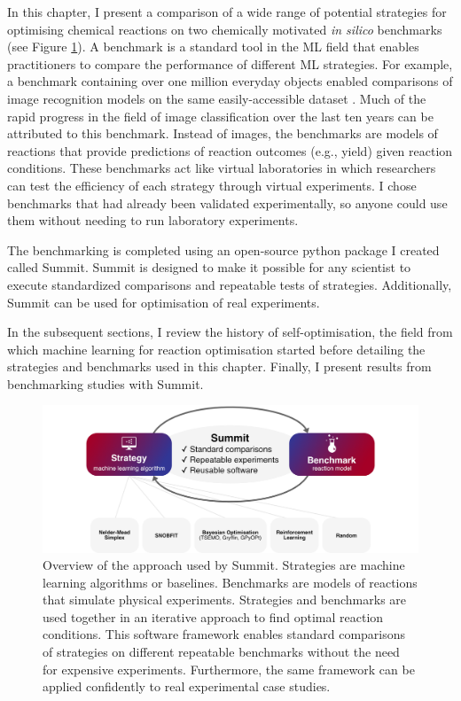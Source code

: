 In this chapter, I present a comparison of a wide range of potential strategies for optimising chemical reactions on two chemically motivated \emph{in silico} benchmarks (see Figure \ref{fig:overview}). A benchmark is a standard tool in the ML field that enables practitioners to compare the performance of different ML strategies. For example, a benchmark containing over one million everyday objects enabled comparisons of image recognition models on the same easily-accessible dataset \cite{Russakovsky2015}. Much of the rapid progress in the field of image classification over the last ten years can be attributed to this benchmark. Instead of images, the benchmarks are models of reactions that provide predictions of reaction outcomes (e.g., yield) given reaction conditions. These benchmarks act like virtual laboratories in which researchers can test the efficiency of each strategy through virtual experiments. I chose benchmarks that had already been validated experimentally, so anyone could use them without needing to run laboratory experiments. 

The benchmarking is completed using an open-source python package I created called Summit. Summit is designed to make it possible for any scientist to execute standardized comparisons and repeatable tests of strategies. Additionally, Summit can be used for optimisation of real experiments.

In the subsequent sections, I review the history of self-optimisation, the field from which machine learning for reaction optimisation started before detailing the strategies and benchmarks used in this chapter. Finally, I present results from benchmarking studies with Summit.

\begin{figure}
    \centering
    \includegraphics[width=\textwidth]{gfx/Chapter03/overview.png}
    \caption{Overview of the approach used by Summit. Strategies are machine learning algorithms or baselines. Benchmarks are models of reactions that simulate physical experiments. Strategies and benchmarks are used together in an iterative approach to find optimal reaction conditions. This software framework enables standard comparisons of strategies on different repeatable benchmarks without the need for expensive experiments. Furthermore, the same framework can be applied confidently to real experimental case studies.}
    \label{fig:overview}
\end{figure}

